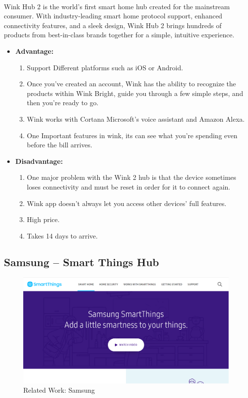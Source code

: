 \documentclass[a4paper, 12pt, oneside]{book}
\newcommand\boldcolor[1]{\textcolor{bold}{\textbf{#1}}}
\begin{document}
		\paragraph{}Wink Hub 2 is the world’s first smart home hub created for the mainstream consumer. With industry-leading smart home protocol support, enhanced connectivity features, and a sleek design, Wink Hub 2 brings hundreds of products from best-in-class brands together for a simple, intuitive experience\cite{wink}.
		
		\begin{itemize}
			\item \boldcolor{Advantage:}
			\begin{enumerate}
				\item Support Different platforms such as iOS or Android.
				\item Once you've created an account, Wink has the ability to recognize the products within Wink Bright, guide you through a few simple steps, and then you're ready to go.
				\item Wink works with Cortana Microsoft’s voice assistant and Amazon Alexa.
				\item One Important features in wink, its can see what you’re spending even before the bill arrives.
			\end{enumerate}
			\item \boldcolor{Disadvantage:} 
			\begin{enumerate}
				\item One major problem with the Wink 2 hub is that the device sometimes loses connectivity and must be reset in order for it to connect again.
				\item Wink app doesn't always let you access other devices' full features.
				\item High price.
				\item Takes 14 days to arrive.
			\end{enumerate}
		\end{itemize}
		\newpage
		\subsection{Samsung – Smart Things Hub}
		\begin{figure}[H]
  			\caption{Related Work: Samsung}
			\includegraphics[width=\linewidth]{img/samsung.png}
		\end{figure}
\end{document}

